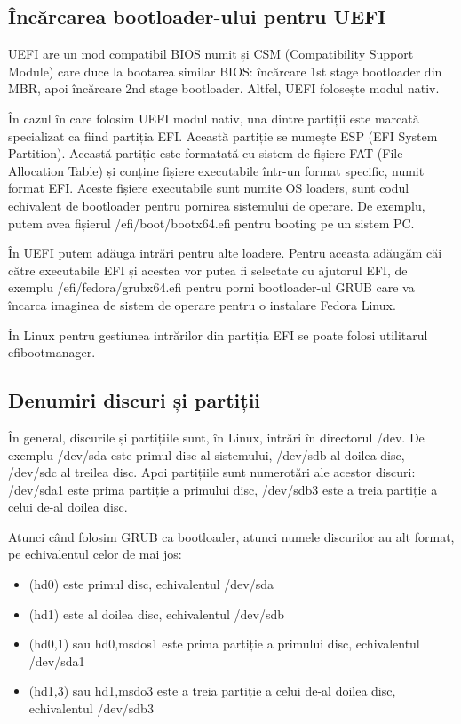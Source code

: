 \subsection{Încărcarea bootloader-ului pentru UEFI}
\label{sec:boot-bootdev-bootuefi}

UEFI are un mod compatibil BIOS numit și CSM  (Compatibility Support Module) care duce la bootarea similar BIOS:
încărcare 1st stage bootloader din MBR, apoi încărcare 2nd stage bootloader.
Altfel, UEFI folosește modul nativ.

În cazul în care folosim UEFI modul nativ, una dintre partiții este marcată
specializat ca fiind partiția EFI. Această partiție se numește ESP
 (EFI System Partition). Această partiție este
formatată cu sistem de fișiere FAT (File Allocation Table) și conține fișiere
executabile într-un format specific, numit format EFI. Aceste fișiere
executabile sunt numite OS loaders, sunt codul echivalent de bootloader pentru
pornirea sistemului de operare. De exemplu, putem avea fișierul
/efi/boot/bootx64.efi pentru booting pe un sistem PC.

În UEFI putem adăuga intrări pentru alte loadere. Pentru aceasta adăugăm căi
către executabile EFI și acestea vor putea fi selectate cu ajutorul EFI, de
exemplu /efi/fedora/grubx64.efi pentru porni bootloader-ul GRUB care va încarca
imaginea de sistem de operare pentru o instalare Fedora Linux.

În Linux pentru gestiunea intrărilor din partiția EFI se poate folosi utilitarul
efibootmanager.

\subsection{Denumiri discuri și partiții}
\label{sec:boot-bootdev-denumiri}

În general, discurile și partițiile sunt, în Linux, intrări în directorul /dev.
De exemplu /dev/sda este primul disc al sistemului, /dev/sdb al doilea disc,
/dev/sdc al treilea disc. Apoi partițiile sunt numerotări ale acestor discuri:
/dev/sda1 este prima partiție a primului disc, /dev/sdb3 este a treia partiție a
celui de-al doilea disc.

Atunci când folosim GRUB ca bootloader, atunci numele discurilor au alt format,
pe echivalentul celor de mai jos:

\begin{itemize}
	\item (hd0) este primul disc, echivalentul /dev/sda
	\item (hd1) este al doilea disc, echivalentul /dev/sdb
	\item (hd0,1) sau hd0,msdos1 este prima partiție a primului disc,
		echivalentul /dev/sda1
	\item (hd1,3) sau hd1,msdo3 este a treia partiție a celui de-al doilea
		disc, echivalentul /dev/sdb3
\end{itemize}

